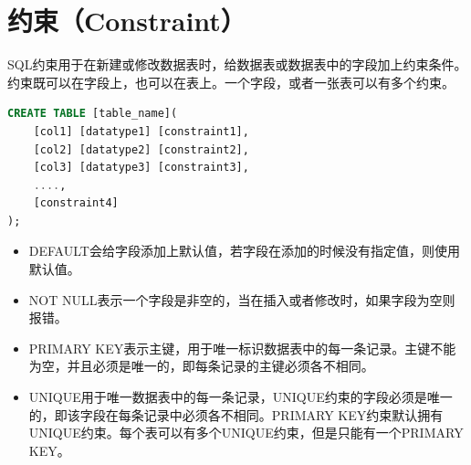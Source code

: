 \documentclass[12pt, openany, oneside]{book}
\begin{document}
\section{约束（Constraint）}

SQL约束用于在新建或修改数据表时，给数据表或数据表中的字段加上约束条件。约束既可以在字段上，也可以在表上。一个字段，或者一张表可以有多个约束。

\vspace{-0.5cm}

\begin{lstlisting}[language=SQL]
CREATE TABLE [table_name](
    [col1] [datatype1] [constraint1],
    [col2] [datatype2] [constraint2],
    [col3] [datatype3] [constraint3],
    ....,
    [constraint4]
);
\end{lstlisting}

\begin{table}[H]
	\centering
	\caption{约束}
\end{table}

\begin{itemize}
	\item DEFAULT会给字段添加上默认值，若字段在添加的时候没有指定值，则使用默认值。

	\item NOT NULL表示一个字段是非空的，当在插入或者修改时，如果字段为空则报错。

	\item PRIMARY KEY表示主键，用于唯一标识数据表中的每一条记录。主键不能为空，并且必须是唯一的，即每条记录的主键必须各不相同。

	\item UNIQUE用于唯一数据表中的每一条记录，UNIQUE约束的字段必须是唯一的，即该字段在每条记录中必须各不相同。PRIMARY KEY约束默认拥有UNIQUE约束。每个表可以有多个UNIQUE约束，但是只能有一个PRIMARY KEY。
\end{itemize}
\end{document}
